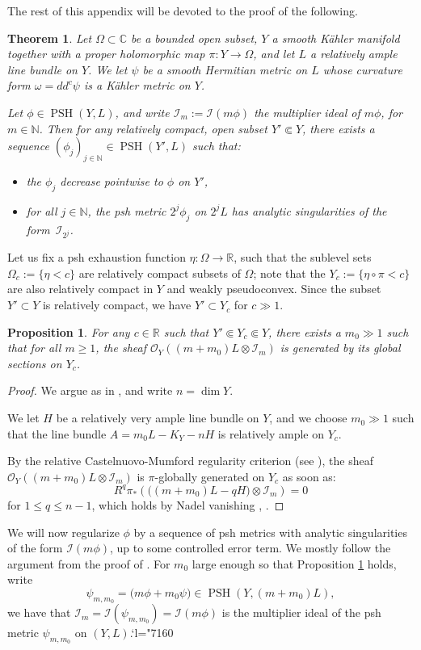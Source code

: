 \documentclass[JEP,XML,SOM,Unicode,published]{cedram}
\newcommand{\Changel}{\mathcode`l="7160}
\newtheorem{theo}[equation]{Theorem}
\newtheorem{prop}[equation]{Proposition}
\theoremstyle{definition}
\newcommand \C{\mathbb C}
\newcommand \N{\mathbb N}
\newcommand \R{\mathbb R}
\newcommand \gO {\mathcal O}
\DeclareMathOperator{\PSH}{PSH}
\begin{document}
The rest of this appendix will be devoted to the proof of the following.\begin{theo} \label{theo reg psh} Let $\Omega \subset \C$ be a bounded open subset, $Y$ a smooth Kähler manifold together with a proper holomorphic map $\pi: Y \to \Omega$, and let $L$ a relatively ample line bundle on $Y$. We let $\psi$ be a smooth Hermitian metric on $L$ whose curvature form $\omega= dd^c \psi$ is a Kähler metric on $Y$.

Let $\phi \in \PSH(Y, L)$, and write $\mathscr{I}_m:= \mathscr{I}(m\phi)$ the multiplier ideal of $m \phi$, for $m \in \N$.
Then for any relatively compact, open subset $Y' \Subset Y$, there exists a sequence $(\phi_j)_{j \in \N} \in \PSH(Y', L)$ such that:
\begin{itemize}
\item the $\phi_j$ decrease pointwise to $\phi$ on $Y'$,
\item for all $j \in \N$, the psh metric $2^j \phi_j$ on $2^j L$ has analytic singularities of the form~$\mathscr{I}_{2^j}$.
\end{itemize}
\end{theo}
Let us fix a psh exhaustion function $\eta: \Omega \to \R$, \ie such that the sublevel sets $\Omega_c:= \{ \eta < c \}$ are relatively compact subsets of $\Omega$; note that the $Y_c:= \{ \eta \circ \pi < c \}$ are also relatively compact in $Y$ and weakly pseudoconvex. Since the subset $Y' \subset Y$ is relatively compact, we have $Y' \subset Y_c$ for $c \gg 1$.
\begin{prop} \label{prop glob gen} For any $c \in \R$ such that $Y' \Subset Y_c \Subset Y$, there exists a $m_0 \gg 1$ such that for all $m \ge 1$, the sheaf $\gO_Y((m+m_0)L\otimes \mathscr{I}_m)$ is generated by its global sections on $Y_c$.
\end{prop}
\begin{proof} We argue as in \cite[Lem.\,5.6]{BBJ}, and write $n = \dim Y$.

We let $H$ be a relatively very ample line bundle on $Y$, and we choose $m_0 \gg 1$ such that the line bundle $A = m_0 L -K_Y -nH$ is relatively ample on $Y_c$.

By the relative Castelnuovo-Mumford regularity criterion (see \cite[Lem.\,1.4]{DEL}), the sheaf $\gO_Y((m+m_0)L\otimes \mathscr{I}_m)$ is $\pi$-globally generated on $Y_c$ as soon as:
\[
R^q \pi_* (\bigl((m+m_0)L -qH\bigr) \otimes \mathscr{I}_m) =0
\]
for $1 \le q \le n-1$, which holds by Nadel vanishing \cite{Nad}, \cite[Th.\,B.8]{BFJ2}.
\end{proof}
We will now regularize $\phi$ by a sequence of psh metrics with analytic singularities of the form $\mathscr{I}(m \phi)$, up to some controlled error term. We mostly follow the argument from the proof of \cite[Th.\,8.1]{GZ}. For $m_0$ large enough so that Proposition \ref{prop glob gen} holds, write
\[
\psi_{m, m_0} = \bigl(m \phi + m_0\psi \bigr) \in \PSH(Y, (m+m_0)L),
\]
we have that $\mathscr{I}_m = \mathscr{I}(\psi_{m, m_0}) = \mathscr{I}(m\phi)$ is the multiplier ideal of the psh metric $\psi_{m, m_0}$ on $(Y, L)$.\Changel
\end{document}
